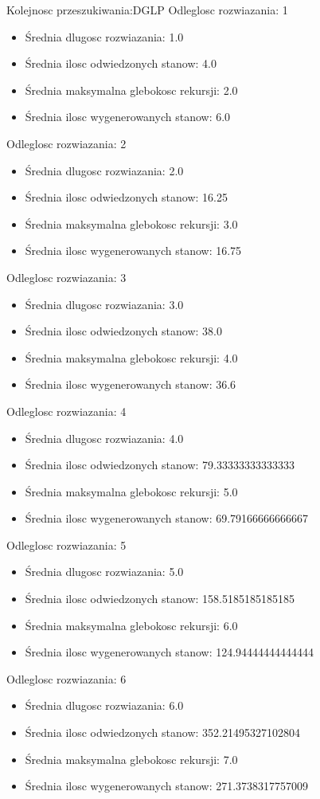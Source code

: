 \documentclass{classrep}
\begin{document}
				Kolejnosc przeszukiwania:DGLP
				Odleglosc rozwiazania: 1
				\begin{itemize}
					\item Średnia dlugosc rozwiazania: 1.0
					\item Średnia ilosc odwiedzonych stanow: 4.0
					\item Średnia maksymalna glebokosc rekursji: 2.0
					\item Średnia ilosc wygenerowanych stanow: 6.0
				\end{itemize}
				Odleglosc rozwiazania: 2
				\begin{itemize}
					\item Średnia dlugosc rozwiazania: 2.0
					\item Średnia ilosc odwiedzonych stanow: 16.25
					\item Średnia maksymalna glebokosc rekursji: 3.0
					\item Średnia ilosc wygenerowanych stanow: 16.75
				\end{itemize}
				Odleglosc rozwiazania: 3
				\begin{itemize}
					\item Średnia dlugosc rozwiazania: 3.0
					\item Średnia ilosc odwiedzonych stanow: 38.0
					\item Średnia maksymalna glebokosc rekursji: 4.0
					\item Średnia ilosc wygenerowanych stanow: 36.6
				\end{itemize}
				Odleglosc rozwiazania: 4
				\begin{itemize}
					\item Średnia dlugosc rozwiazania: 4.0
					\item Średnia ilosc odwiedzonych stanow: 79.33333333333333
					\item Średnia maksymalna glebokosc rekursji: 5.0
					\item Średnia ilosc wygenerowanych stanow: 69.79166666666667
				\end{itemize}
				Odleglosc rozwiazania: 5
				\begin{itemize}
					\item Średnia dlugosc rozwiazania: 5.0
					\item Średnia ilosc odwiedzonych stanow: 158.5185185185185
					\item Średnia maksymalna glebokosc rekursji: 6.0
					\item Średnia ilosc wygenerowanych stanow: 124.94444444444444
				\end{itemize}
				Odleglosc rozwiazania: 6
				\begin{itemize}
					\item Średnia dlugosc rozwiazania: 6.0
					\item Średnia ilosc odwiedzonych stanow: 352.21495327102804
					\item Średnia maksymalna glebokosc rekursji: 7.0
					\item Średnia ilosc wygenerowanych stanow: 271.3738317757009
				\end{itemize}
\end{document}
